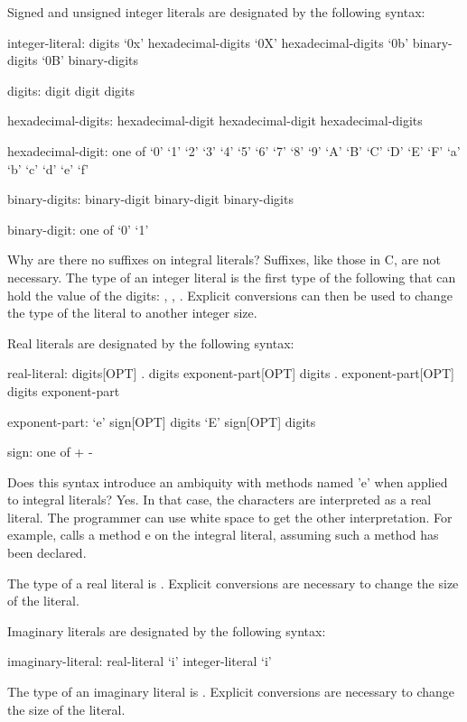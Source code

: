 Signed and unsigned integer literals are designated by the following
syntax:
\begin{syntax}
integer-literal:
  digits
  `0x' hexadecimal-digits
  `0X' hexadecimal-digits
  `0b' binary-digits
  `0B' binary-digits

digits:
  digit
  digit digits

hexadecimal-digits:
  hexadecimal-digit
  hexadecimal-digit hexadecimal-digits

hexadecimal-digit: one of
  `0' `1' `2' `3' `4' `5' `6' `7' `8' `9' `A' `B' `C' `D' `E' `F' `a' `b' `c' `d' `e' `f'

binary-digits:
  binary-digit
  binary-digit binary-digits

binary-digit: one of
  `0' `1'
\end{syntax}

\begin{rationale}
Why are there no suffixes on integral literals?  Suffixes, like those
in C, are not necessary.  The type of an integer literal is the first
type of the following that can hold the value of the
digits: , , .  Explicit
conversions can then be used to change the type of the literal to
another integer size.
\end{rationale}

Real literals are designated by the following syntax:
\begin{syntax}
real-literal:
  digits[OPT] . digits exponent-part[OPT]
  digits . exponent-part[OPT]
  digits exponent-part

exponent-part:
  `e' sign[OPT] digits
  `E' sign[OPT] digits

sign: one of
  + -
\end{syntax}
\begin{rationale}
Does this syntax introduce an ambiquity with methods named 'e' when
applied to integral literals?  Yes.  In that case, the characters are
interpreted as a real literal.  The programmer can use white space to
get the other interpretation.  For example,  calls a
method e on the integral literal, assuming such a method has been
declared.
\end{rationale}
The type of a real literal is .  Explicit conversions are
necessary to change the size of the literal.

Imaginary literals are designated by the following syntax:
\begin{syntax}
imaginary-literal:
  real-literal `i'
  integer-literal `i'
\end{syntax}
The type of an imaginary literal is .  Explicit conversions
are necessary to change the size of the literal.

